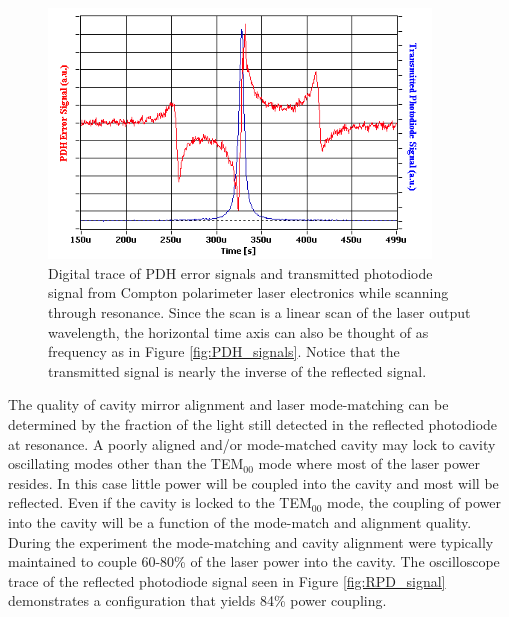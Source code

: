 \begin{figure}
\begin{center}
\includegraphics[width=4in]{./Pictures/PDH_error.PNG}
\caption{Digital trace of PDH error signals  and transmitted photodiode signal from Compton polarimeter laser electronics while scanning through resonance. Since the scan is a linear scan of the laser output wavelength, the horizontal time axis can also be thought of as frequency as in Figure \ref{fig:PDH_signals}. Notice that the transmitted signal is nearly the inverse of the reflected signal.}
\label{fig:PDH_digilock}
\end{center}
\end{figure}

The quality of cavity mirror alignment and laser mode-matching can be determined by the fraction of the light still detected in the reflected photodiode at resonance. A poorly aligned and/or mode-matched cavity may lock to cavity oscillating modes other than the TEM$_{00}$ mode where most of the laser power resides. In this case little power will be coupled into the cavity and most will be reflected. Even if the cavity is locked to the TEM$_{00}$ mode, the coupling of power into the cavity will be a function of the mode-match and alignment quality. During the \Qs experiment the mode-matching and cavity alignment were typically maintained to couple 60-80\% of the laser power into the cavity. The oscilloscope trace of the reflected photodiode signal seen in Figure \ref{fig:RPD_signal} demonstrates a configuration that yields 84\% power coupling.

